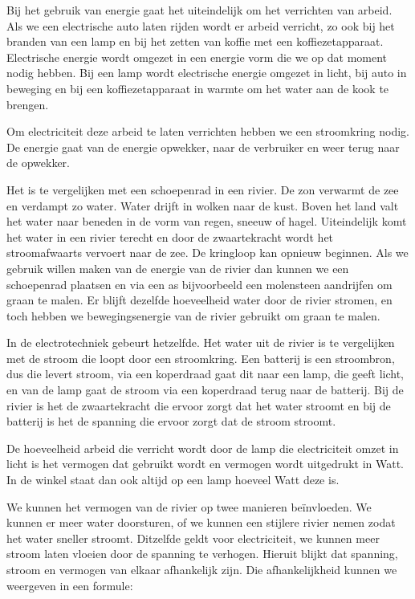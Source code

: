 Bij het gebruik van energie gaat het uiteindelijk om het verrichten van arbeid. Als we een electrische auto laten rijden wordt er arbeid verricht, zo ook bij het branden van een lamp en bij het zetten van koffie met een koffiezetapparaat. Electrische energie wordt omgezet in een energie vorm die we op dat moment nodig hebben. Bij een lamp wordt electrische energie omgezet in licht, bij auto in beweging en bij een koffiezetapparaat in warmte om het water aan de kook te brengen.

Om electriciteit deze arbeid te laten verrichten hebben we een stroomkring nodig. De energie gaat van de energie opwekker, naar de verbruiker en weer terug naar de opwekker.

Het is te vergelijken met een schoepenrad in een rivier. De zon verwarmt de zee en verdampt zo water. Water drijft in wolken naar de kust. Boven het land valt het water naar beneden in de vorm van regen, sneeuw of hagel. Uiteindelijk komt het water in een rivier terecht en door de zwaartekracht wordt het stroomafwaarts vervoert naar de zee. De kringloop kan opnieuw beginnen. Als we gebruik willen maken van de energie van de rivier dan kunnen we een schoepenrad plaatsen en via een as bijvoorbeeld een molensteen aandrijfen om graan te malen. Er blijft dezelfde hoeveelheid water door de rivier stromen, en toch hebben we bewegingsenergie van de rivier gebruikt om graan te malen.

In de electrotechniek gebeurt hetzelfde. Het water uit de rivier is te vergelijken met de stroom die loopt door een stroomkring. Een batterij is een stroombron, dus die levert stroom, via een koperdraad gaat dit naar een lamp, die geeft licht, en van de lamp gaat de stroom via een koperdraad terug naar de batterij. Bij de rivier is het de zwaartekracht die ervoor zorgt dat het water stroomt en bij de batterij is het de spanning die ervoor zorgt dat de stroom stroomt.

De hoeveelheid arbeid die verricht wordt door de lamp die electriciteit omzet in licht is het vermogen dat gebruikt wordt en vermogen wordt uitgedrukt in Watt. In de winkel staat dan ook altijd op een lamp hoeveel Watt deze is.

We kunnen het vermogen van de rivier op twee manieren be\"invloeden. We kunnen er meer water doorsturen, of we kunnen een stijlere rivier nemen zodat het water sneller stroomt. Ditzelfde geldt voor electriciteit, we kunnen meer stroom laten vloeien door de spanning te verhogen. Hieruit blijkt dat spanning, stroom en vermogen van elkaar afhankelijk zijn. Die afhankelijkheid kunnen we weergeven in een formule:

